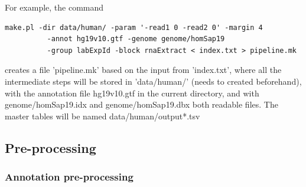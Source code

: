 \documentclass{article}
\begin{document}
For example, the command
\begin{verbatim}
make.pl -dir data/human/ -param '-read1 0 -read2 0' -margin 4 
          -annot hg19v10.gtf -genome genome/homSap19 
          -group labExpId -block rnaExtract < index.txt > pipeline.mk
\end{verbatim}
creates a file 'pipeline.mk' based on the input from 'index.txt', where all the intermediate steps will be stored in 'data/human/' (needs to 
created beforehand), with the annotation file hg19v10.gtf in the current directory, and with genome/homSap19.idx and genome/homSap19.dbx both 
readable files. The master tables will be named data/human/output*.tsv


\subsection{Pre-processing}

\subsubsection{Annotation pre-processing}
\label{sec::preprocessing}
\end{document}
